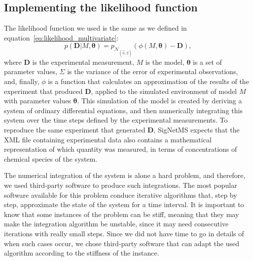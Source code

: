 \subsection{Implementing the likelihood function}
The likelihood function we used is the same as we defined in
equation~\ref{eq:likelihood_multivariate}:
\begin{equation*}
    p ({\bm D} | M,{\bm \theta}) = 
        p_{\mathcal{N}_{\left(\vec{0}, \Sigma\right)}}
        (\phi (M, {\bm\theta}) - {\bm D}),
\end{equation*}
where ${\bm D}$ is the experimental measurement, $M$ is the model,
${\bm \theta}$ is a set of parameter values, $\Sigma$ is the variance of
the error of experimental observations, and, finally, $\phi$ is a 
function that calculates an approximation of the results of the
experiment that produced ${\bm D}$, applied to the simulated environment
of model $M$ with parameter values ${\bm \theta}$. This simulation of
the model is created by deriving a system of ordinary differential
equations, and then numerically integrating this system over the time
steps defined by the experimental measurements. To reproduce the same
experiment that generated ${\bm D}$, SigNetMS expects that the XML file 
containing experimental data also contains a mathematical representation
of which quantity was measured, in terms of concentrations of chemical
species of the system.

The numerical integration of the system is alone a hard problem, and
therefore, we used third-party software to produce such integrations.
The most popular software available for this problem conduce
iterative algorithms that, step by step, approximate the state of the
system for a time interval. It is important to know that some instances
of the problem can be stiff, meaning that they may make the integration
algorithm be unstable, since it may need consecutive iterations with
really small steps. Since we did not have time to go in details of when 
such cases occur, we chose third-party software that can adapt the used
algorithm according to the stiffness of the instance.

